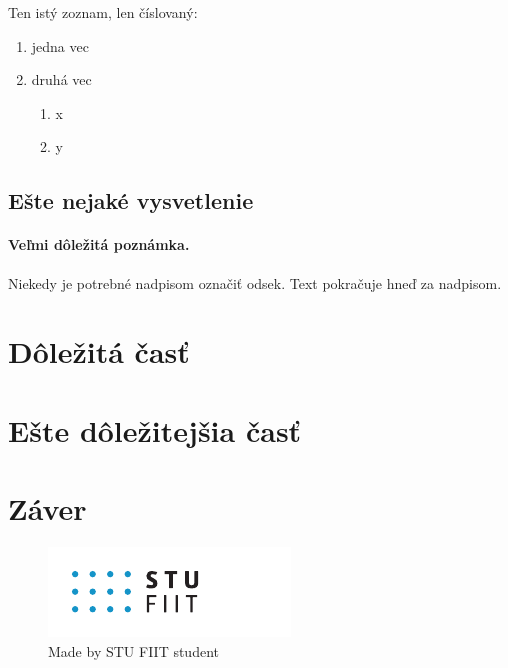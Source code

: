 \documentclass[10pt,twoside,a4paper,english]{article}
\begin{document}
	Ten istý zoznam, len číslovaný:

	\begin{enumerate}
		\item jedna vec
		\item druhá vec
		\begin{enumerate}
			\item x
			\item y
		\end{enumerate}
	\end{enumerate}


	\subsection{Ešte nejaké vysvetlenie} \label{ina:este}

	\paragraph{Veľmi dôležitá poznámka.}
	Niekedy je potrebné nadpisom označiť odsek. Text pokračuje hneď za nadpisom.



	\section{Dôležitá časť} \label{dolezita}




	\section{Ešte dôležitejšia časť} \label{dolezitejsia}




	\section{Záver} \label{zaver} %

	\begin{figure}[tbh]
		\centering
		\includegraphics[scale=0.8]{logo_fiit.pdf}
		\caption{Made by STU FIIT student}
	\end{figure}



	
\end{document}
